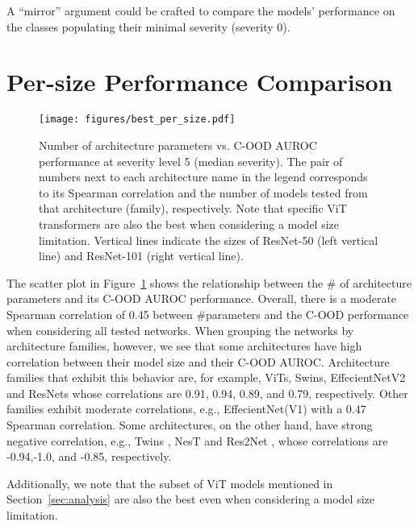 \documentclass[table]{article} \usepackage{PRIMEarxiv}
\begin{document}
A ``mirror'' argument could be crafted to compare the models' performance on the classes populating their minimal severity (severity 0).

\section{Per-size Performance Comparison}
\label{sec:OOD-per-size}
\begin{figure}[htb]
    \centering
    \texttt{[image: figures/best\_per\_size.pdf]}
    \caption{Number of architecture parameters vs. C-OOD AUROC performance at severity level 5 (median severity). The pair of numbers next to each architecture name in the legend corresponds to its Spearman correlation
    and the number of models tested from that architecture (family), respectively. 
    Note that specific ViT transformers are also the best when considering a model size limitation. Vertical lines indicate the sizes of ResNet-50 (left vertical line) and ResNet-101 (right vertical line).}
    \label{fig:best per size}
\end{figure}

The scatter plot in Figure~\ref{fig:best per size} shows the relationship between the \# of 
architecture parameters and its C-OOD AUROC performance.
Overall, there is a moderate Spearman correlation of 0.45 between \#parameters and the C-OOD performance when considering all tested networks. When grouping the networks by architecture families, however, we see that some architectures have high correlation between 
their model size and their C-OOD AUROC.
Architecture families that exhibit this behavior are, for example,  ViTs, Swins, EffecientNetV2 and ResNets  whose correlations are 0.91, 0.94, 0.89, and 0.79, respectively. Other families exhibit moderate correlations, e.g.,  EffecientNet(V1) with a 0.47 Spearman correlation. 
Some architectures, on the other hand, have  strong negative correlation, e.g., 
Twins \cite{chu2021twins}, NesT \cite{zhang2020resnest} and Res2Net \cite{Gao_2021}, whose correlations are
 -0.94,-1.0, and -0.85, respectively.

Additionally, we note that the subset of ViT models mentioned in Section~\ref{sec:analysis} are also the best even when considering a model size limitation.
\end{document}
